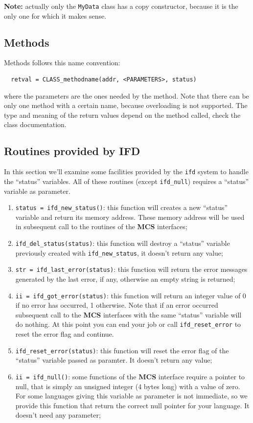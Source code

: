 \documentclass[12pt,titlepage]{book}
\newcommand{\mcs}{\textbf{MCS} }
\begin{document}
\noindent \textbf{Note:} actually only the \verb|MyData| class has a copy
constructor, because it is the only one for which it makes sense.

\subsection{Methods}
\label{ssec-Methods}
Methods follows this name convention:
\begin{verbatim}
  retval = CLASS_methodname(addr, <PARAMETERS>, status)
\end{verbatim}
where the parameters are the ones needed by the method. Note that there can be
only one method with a certain name, because overloading is not supported. The
type and meaning of the return values depend on the method called, check the
class documentation.

\subsection{Routines provided by IFD}
\label{ssec-Routines provided by IFD}
In this section we'll examine some facilities provided by the \verb|ifd|
system to handle the ``status'' variables. All of these routines (except
\verb|ifd_null|) requires a ``status'' variable as parameter.
\begin{enumerate}
\item \verb|status = ifd_new_status()|: this function will creates a new
  ``status'' variable and return its memory address. These memory address will
  be used in subsequent call to the routines of the \mcs interfaces;
\item \verb|ifd_del_status(status)|: this function will destroy a ``status''
  variable previously created with \verb|ifd_new_status|, it doesn't return
  any value;
\item \verb|str = ifd_last_error(status)|: this function will return the error
  messages generated by the last error, if any, otherwise an empty string is
  returned;
\item \verb|ii = ifd_got_error(status)|: this function will return an integer
  value of 0 if no error has occurred, 1 otherwise. Note that if an error
  occurred subsequent call to the \mcs interfaces with the same ``status''
  variable will do nothing. At this point you can end your job or call
  \verb|ifd_reset_error| to reset the error flag and continue.
\item \verb|ifd_reset_error(status)|: this function will reset the error flag
  of the ``status'' variable passed as paramter. It doesn't return any value;
\item \verb|ii = ifd_null()|: some functions of the \mcs interface require a
  pointer to null, that is simply an unsigned integer (4 bytes long) with a
  value of zero. For some languages giving this variable as parameter is not
  immediate, so we provide this function that return the correct null pointer
  for your language. It doesn't need any parameter;
\end{enumerate}
\end{document}
